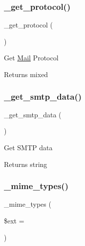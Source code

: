 \subsubsection{\texorpdfstring{\+\_\+get\+\_\+protocol()}{\_get\_protocol()}}
{\footnotesize\ttfamily \+\_\+get\+\_\+protocol (\begin{DoxyParamCaption}{ }\end{DoxyParamCaption})\hspace{0.3cm}{\ttfamily [protected]}}

Get \mbox{\hyperlink{class_mail}{Mail}} Protocol

\begin{DoxyReturn}{Returns}
mixed 
\end{DoxyReturn}
\mbox{\label{class_c_i___email_ac421324c92e681315a1f2d0d7fa96a5b}} 
\subsubsection{\texorpdfstring{\+\_\+get\+\_\+smtp\+\_\+data()}{\_get\_smtp\_data()}}
{\footnotesize\ttfamily \+\_\+get\+\_\+smtp\+\_\+data (\begin{DoxyParamCaption}{ }\end{DoxyParamCaption})\hspace{0.3cm}{\ttfamily [protected]}}

Get S\+M\+TP data

\begin{DoxyReturn}{Returns}
string 
\end{DoxyReturn}
\mbox{\label{class_c_i___email_a7581ef570bb25b483e80ee996c42e454}} 
\subsubsection{\texorpdfstring{\+\_\+mime\+\_\+types()}{\_mime\_types()}}
{\footnotesize\ttfamily \+\_\+mime\+\_\+types (\begin{DoxyParamCaption}\item[{}]{\$ext = {\ttfamily \textquotesingle{}\textquotesingle{}} }\end{DoxyParamCaption})\hspace{0.3cm}{\ttfamily [protected]}}

